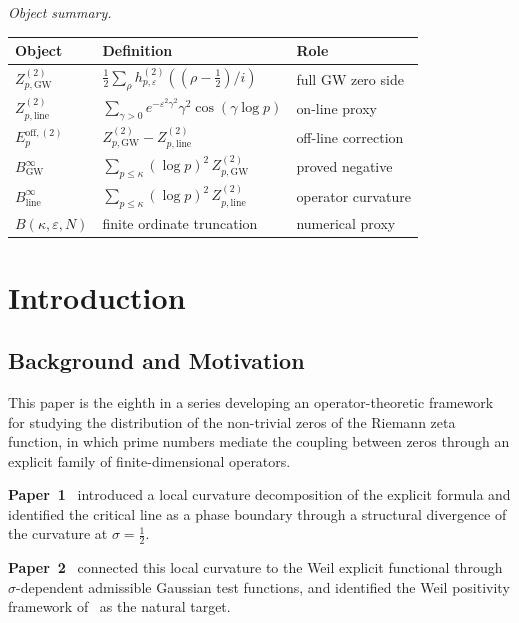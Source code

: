 \documentclass[11pt]{article}
\newcommand{\BinfGW}{B_{\mathrm{GW}}^{\infty}}   %
\newcommand{\Binfline}{B_{\mathrm{line}}^{\infty}} %
\newcommand{\ZtwoGW}{Z_{p,\mathrm{GW}}^{(2)}}   %
\newcommand{\Ztwoline}{Z_{p,\mathrm{line}}^{(2)}} %
\newcommand{\Eoff}{E_p^{\mathrm{off},(2)}}  %
\begin{document}
\medskip
\emph{Object summary.}
\begin{center}
\begin{tabular}{lll}
\toprule
Object & Definition & Role \\
\midrule
$\ZtwoGW$ & $\tfrac12\sum_\rho h^{(2)}_{p,\varepsilon}((\rho-\tfrac12)/i)$ & full GW zero side \\
$\Ztwoline$ & $\sum_{\gamma>0} e^{-\varepsilon^2\gamma^2}\gamma^2\cos(\gamma\log p)$ & on-line proxy \\
$\Eoff$ & $\ZtwoGW-\Ztwoline$ & off-line correction \\
$\BinfGW$ & $\sum_{p\le\kappa}(\log p)^2\,\ZtwoGW$ & proved negative \\
$\Binfline$ & $\sum_{p\le\kappa}(\log p)^2\,\Ztwoline$ & operator curvature \\
$B(\kappa,\varepsilon,N)$ & finite ordinate truncation & numerical proxy \\
\bottomrule
\end{tabular}
\end{center}

\vspace{2em}
\newpage
\section{Introduction}
\label{sec:intro}

\subsection{Background and Motivation}

This paper is the eighth in a series developing an operator-theoretic
framework for studying the distribution of the non-trivial zeros of the
Riemann zeta function, in which prime numbers mediate the coupling between
zeros through an explicit family of finite-dimensional operators.

\textbf{Paper~1}~\cite{Paper1} introduced a local curvature decomposition
of the explicit formula and identified the critical line as a phase
boundary through a structural divergence of the curvature at
$\sigma=\tfrac12$.

\textbf{Paper~2}~\cite{Paper2} connected this local curvature to the Weil
explicit functional through $\sigma$-dependent admissible Gaussian test
functions, and identified the Weil positivity framework
of~\cite{Lagarias} as the natural target.
\end{document}
